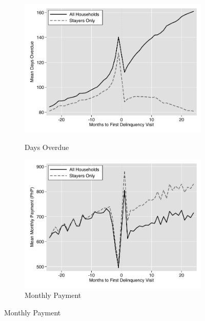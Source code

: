 \documentclass[12pt]{article}
\begin{document}
\begin{figure}[hbtp]
\begin{subfigure}[b]{0.49\textwidth}
        \label{fig:line_bal}
    \end{subfigure}
    \vskip 1mm \vskip 0pt
    \begin{subfigure}[b]{0.49\textwidth}
        \centering
        \caption[]{\small Days Overdue}
        \vspace{-1mm}
        \includegraphics[width=\textwidth,trim={.2cm .2cm .2cm 0cm}, clip=true]{tables/line_ar}
        \label{fig:line_ar}
    \end{subfigure}
    \hfill
    \begin{subfigure}[b]{0.49\textwidth}  
        \centering
        \caption[]{\small Monthly Payment}  
        \vspace{-1mm}
        \includegraphics[width=\textwidth,trim={.2cm .2cm .2cm 0cm}, clip=true]{tables/line_pay}

\end{subfigure}
\end{figure}
\end{document}
